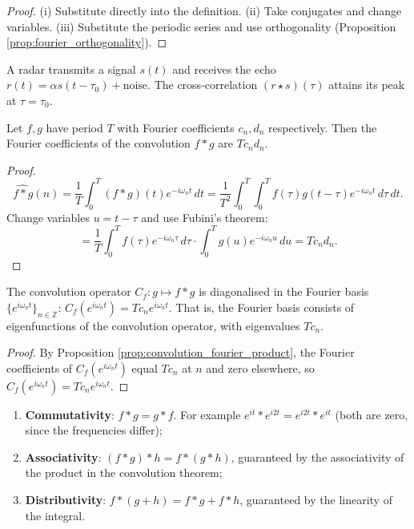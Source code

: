 \begin{proof}
(i) Substitute directly into the definition. (ii) Take conjugates and change variables. (iii) Substitute the periodic series and use orthogonality (Proposition \ref{prop:fourier_orthogonality}).
\end{proof}

\begin{example}\label{ex:echo_delay}
A radar transmits a signal $s(t)$ and receives the echo $r(t) = \alpha s(t - \tau_0) + \text{noise}$. The cross-correlation $(r \star s)(\tau)$ attains its peak at $\tau = \tau_0$.
\end{example}

\begin{proposition}\label{prop:convolution_fourier_product}
Let $f, g$ have period $T$ with Fourier coefficients $c_n, d_n$ respectively. Then the Fourier coefficients of the convolution $f * g$ are $T c_n d_n$.
\end{proposition}

\begin{proof}
\[
\widehat{f * g}(n) = \frac{1}{T}\int_0^T (f * g)(t) e^{-i\omega_n t}\,dt = \frac{1}{T^2}\int_0^T \int_0^T f(\tau) g(t-\tau) e^{-i\omega_n t}\,d\tau\,dt.
\]
Change variables $u = t - \tau$ and use Fubini's theorem:
\[
= \frac{1}{T} \int_0^T f(\tau) e^{-i\omega_n \tau}\,d\tau \cdot \int_0^T g(u) e^{-i\omega_n u}\,du = T c_n d_n.
\]
\end{proof}

\begin{corollary}\label{cor:convolution_diagonalisation}
The convolution operator $C_f: g \mapsto f * g$ is diagonalised in the Fourier basis $\{e^{i\omega_n t}\}_{n \in \mathbb{Z}}$: $C_f(e^{i\omega_n t}) = T c_n e^{i\omega_n t}$. That is, the Fourier basis consists of eigenfunctions of the convolution operator, with eigenvalues $T c_n$.
\end{corollary}

\begin{proof}
By Proposition \ref{prop:convolution_fourier_product}, the Fourier coefficients of $C_f(e^{i\omega_n t})$ equal $T c_n$ at $n$ and zero elsewhere, so $C_f(e^{i\omega_n t}) = T c_n e^{i\omega_n t}$.
\end{proof}

\begin{example}\label{ex:convolution_algebra_example}
\begin{enumerate}[label=(\roman*)]
  \item \textbf{Commutativity}: $f * g = g * f$. For example $e^{it} * e^{i2t} = e^{i2t} * e^{it}$ (both are zero, since the frequencies differ);
  \item \textbf{Associativity}: $(f * g) * h = f * (g * h)$, guaranteed by the associativity of the product in the convolution theorem;
  \item \textbf{Distributivity}: $f * (g + h) = f * g + f * h$, guaranteed by the linearity of the integral.
\end{enumerate}
\end{example}

